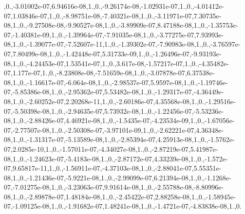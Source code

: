 \begin{DoxyCompactItemize}
,0.,-\/3.\-01002e-\/07,6.\-94616e-\/08,1.,0.,-\/9.\-26174e-\/08,-\/1.\-02931e-\/07,1.,0.,-\/4.\-01412e-\/07,1.\-03846e-\/07,1.,0.,-\/8.\-98751e-\/08,-\/7.\-40321e-\/08,1.,0.,-\/3.\-11971e-\/07,7.\-30735e-\/08,1.,0.,-\/9.\-27508e-\/08,-\/9.\-90527e-\/08,1.,0.,-\/3.\-89909e-\/07,8.\-47188e-\/08,1.,0.,-\/1.\-35753e-\/07,-\/1.\-40381e-\/09,1.,0.,-\/1.\-39964e-\/07,-\/7.\-91035e-\/08,1.,0.,-\/3.\-77275e-\/07,7.\-93993e-\/08,1.,0.,-\/1.\-39077e-\/07,-\/7.\-52607e-\/11,1.,0.,-\/1.\-39302e-\/07,-\/7.\-90983e-\/08,1.,0.,-\/3.\-76597e-\/07,7.\-80499e-\/08,1.,0.,-\/1.\-42448e-\/07,5.\-31733e-\/09,1.,0.,-\/1.\-26496e-\/07,-\/9.\-93193e-\/08,1.,0.,-\/4.\-24453e-\/07,1.\-53541e-\/07,1.,0.,3.\-617e-\/08,-\/1.\-57217e-\/07,1.,0.,-\/4.\-35482e-\/07,1.\-177e-\/07,1.,0.,-\/8.\-23808e-\/08,-\/7.\-51659e-\/08,1.,0.,-\/3.\-07878e-\/07,6.\-37538e-\/08,1.,0.,-\/1.\-16617e-\/07,-\/6.\-064e-\/08,1.,0.,-\/2.\-98537e-\/07,5.\-9597e-\/08,1.,0.,-\/1.\-19746e-\/07,-\/5.\-85386e-\/08,1.,0.,-\/2.\-95362e-\/07,5.\-53482e-\/08,1.,0.,-\/1.\-29317e-\/07,-\/4.\-36449e-\/08,1.,0.,-\/2.\-60252e-\/07,2.\-20268e-\/11,1.,0.,-\/2.\-60186e-\/07,4.\-35568e-\/08,1.,0.,-\/1.\-29516e-\/07,-\/5.\-50398e-\/08,1.,0.,-\/2.\-94635e-\/07,5.\-73932e-\/08,1.,0.,-\/1.\-22456e-\/07,-\/5.\-53236e-\/08,1.,0.,-\/2.\-88426e-\/07,4.\-46921e-\/08,1.,0.,-\/1.\-5435e-\/07,-\/4.\-23534e-\/09,1.,0.,-\/1.\-67056e-\/07,-\/2.\-77507e-\/08,1.,0.,-\/2.\-50308e-\/07,-\/3.\-97101e-\/09,1.,0.,-\/2.\-62221e-\/07,4.\-36348e-\/08,1.,0.,-\/1.\-31317e-\/07,-\/5.\-13589e-\/08,1.,0.,-\/2.\-85394e-\/07,4.\-25913e-\/08,1.,0.,-\/1.\-5762e-\/07,2.\-0285e-\/10,1.,0.,-\/1.\-57011e-\/07,-\/4.\-34027e-\/08,1.,0.,-\/2.\-87219e-\/07,5.\-41987e-\/08,1.,0.,-\/1.\-24623e-\/07,-\/5.\-4183e-\/08,1.,0.,-\/2.\-87172e-\/07,4.\-33239e-\/08,1.,0.,-\/1.\-572e-\/07,9.\-65817e-\/11,1.,0.,-\/1.\-56911e-\/07,-\/4.\-37103e-\/08,1.,0.,-\/2.\-88041e-\/07,5.\-55351e-\/08,1.,0.,-\/1.\-21436e-\/07,-\/5.\-9221e-\/08,1.,0.,-\/2.\-99099e-\/07,6.\-21394e-\/08,1.,0.,-\/1.\-1268e-\/07,-\/7.\-01275e-\/08,1.,0.,-\/3.\-23063e-\/07,9.\-91614e-\/08,1.,0.,-\/2.\-55788e-\/08,-\/8.\-80996e-\/08,1.,0.,-\/2.\-89878e-\/07,1.\-48184e-\/08,1.,0.,-\/2.\-45422e-\/07,2.\-88258e-\/08,1.,0.,-\/1.\-58945e-\/07,-\/1.\-09125e-\/08,1.,0.,-\/1.\-91682e-\/07,1.\-48241e-\/08,1.,0.,-\/1.\-4721e-\/07,-\/4.\-83838e-\/08,1.,0.
\end{DoxyCompactItemize}
